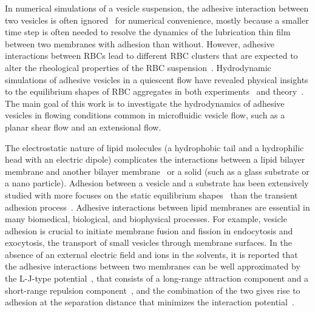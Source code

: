 \documentclass[prf,superscriptaddress,showpacs]{revtex4-1}
\begin{document}
In numerical simulations of a vesicle suspension, the adhesive
interaction between two vesicles is often
ignored~\cite{Veerapaneni2009_JCP,  RahimianVeerapaneniBiros2010_JCP}
for numerical convenience, mostly because a smaller time step is often
needed to resolve the dynamics of the lubrication thin film between two
membranes with adhesion than without.  However, adhesive interactions
between RBCs lead to different RBC clusters that are expected to alter
the rheological properties of the RBC
suspension~\cite{NeuMeiselman2002_BJ,
SvetinaZiherl2008_Bioelectrochemistry}. Hydrodynamic simulations of
adhesive vesicles in a quiescent flow have revealed physical insights to
the equilibrium shapes of RBC aggregates in both
experiments~\cite{FlormannAouane2017_SciReports} and
theory~\cite{ZiherlSvetina2007_PNAS}. The main goal of this work is to
investigate the hydrodynamics of adhesive vesicles in flowing conditions
common in microfluidic vesicle flow, such as a planar shear flow and an
extensional flow.

The electrostatic nature of lipid molecules (a hydrophobic tail and a
hydrophilic head with an electric dipole) complicates the interactions
between a lipid bilayer membrane and another bilayer
membrane~\cite{EvansMetcalfe1984_BJ, Book_PhysicalBasisCellAdhesion,
Book_IntermolecularSurfaceForces, PerutkovaFrank-Bertoncelij2013_CSB} or
a solid (such as a glass substrate or a nano particle).  Adhesion
between a vesicle and a substrate has been extensively studied with more
focuses on the static equilibrium shapes~\cite{Seifert1990_PRA,
ShiFengGao2006_ActaMechSin, LinFreund2007_IntJSolidsStructures,
GruhnFrankeDimova2007_Langmuir,das2008adhesion, zhang2009phase,
SteinkuhlerAgudo-Canalejo2016_BJ} than the transient adhesion
process~\cite{cantat1999lift, suk-sei2001, BlountMiksisDavis2013_PRSa}.
Adhesive interactions between lipid membranes are essential in many
biomedical, biological, and biophysical processes.  For example, vesicle
adhesion is crucial to initiate membrane fusion and fission in
endocytosis and exocytosis, the transport of small vesicles through
membrane surfaces.  In the absence of an external electric field and
ions in the solvents, it is reported that the adhesive interactions
between two membranes can be well approximated by the L-J-type
potential~\cite{FlormannAouane2017_SciReports}, that consists of a
long-range attraction component and a short-range repulsion
component~\cite{Book_IntermolecularSurfaceForces}, and the combination
of the two gives rise to adhesion at the separation distance that
minimizes the interaction
potential~\cite{Book_IntermolecularSurfaceForces}. 
\end{document}
